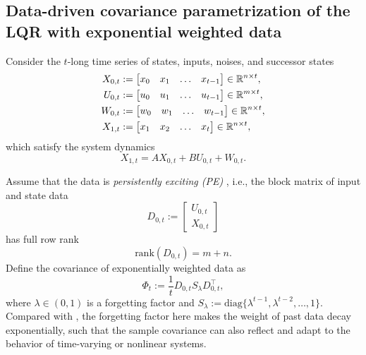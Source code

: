 \subsection{Data-driven covariance parametrization of the LQR with exponential weighted data}\label{sec:3-B}
Consider the $t$-long time series of states, inputs, noises, and successor states
\begin{align}
X_{0,t} &:= \begin{bmatrix}
x_{0} & x_{1} & \dots& x_{t-1} 
\end{bmatrix}\in \mathbb{R}^{n\times t},\nonumber\\
U_{0,t} &:= \begin{bmatrix}
u_{0} & u_{1} & \dots& u_{t-1} 
\end{bmatrix}\in \mathbb{R}^{m\times t}, \label{equ:dataMat}\\
W_{0,t} &:= \begin{bmatrix}
w_{0} & w_{1} & \dots& w_{t-1} 
\end{bmatrix}\in \mathbb{R}^{n\times t}, \nonumber\\
X_{1,t} &:= \begin{bmatrix}
x_{1} & x_{2} & \dots& x_{t} 
\end{bmatrix}\in \mathbb{R}^{n\times t}, \nonumber
\end{align}
which satisfy the system dynamics
\begin{equation}\label{equ:dynamics}
X_{1,t} = AX_{0,t}+ BU_{0,t} + W_{0,t}.
\end{equation}


Assume that the data is {\em persistently exciting (PE)} \cite{willems2005note}, i.e., the block matrix of input and state data
\begin{equation}
D_{0,t} := 
\begin{bmatrix}
    U_{0,t} \\
    X_{0,t}
\end{bmatrix}
\end{equation}
has full row rank
\begin{equation}\label{equ:rank}
\text{rank}(D_{0,t}) = m+n.
\end{equation}
Define the covariance of exponentially weighted data as
\begin{equation}
    \Phi_{t} := \frac{1}{t}D_{0,t} S_{\lambda} D_{0,t}^{\top},
\end{equation}
where $\lambda \in (0,1)$ is a forgetting factor and $S_{\lambda} := \text{diag}\{ \lambda^{t-1}, \lambda^{t-2},\dots, 1\}$. Compared with \cite{zhao2024data}, the forgetting factor here makes the weight of past data decay exponentially, such that the sample covariance can also reflect and adapt to the behavior of time-varying or nonlinear systems. 


